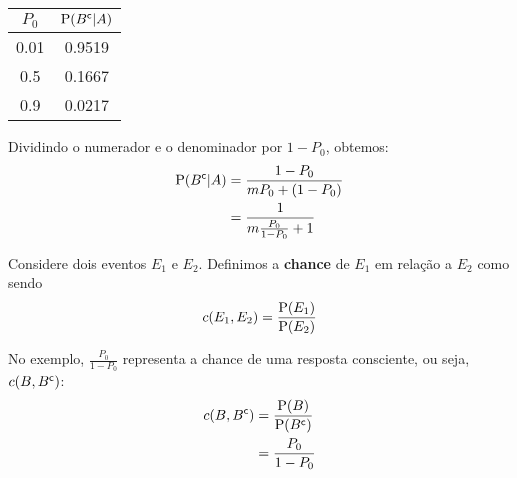 \begin{example}
    \begin{center}
        \begin{tabular}{c|c}
            \toprule
            $P_0$ & $\operatorname{P}({B}^{\mathsf{c}} | A)$ \\
            \midrule
            0.01 & 0.9519 \\
            0.5  & 0.1667 \\
            0.9  & 0.0217 \\
            \bottomrule
        \end{tabular}
    \end{center}

    Dividindo o numerador e o denominador por $1 - P_0$, obtemos:
    \begin{align*}
        \operatorname{P}({B}^{\mathsf{c}} | A) 
        &= \frac{1 - P_0}
            {mP_0 + (1 - P_0)} \\
        &= \frac{1}
            {m\frac{P_0}{1 - P_0} + 1}
    \end{align*}

    \begin{definition}
        Considere dois eventos $E_1$ e $E_2$. Definimos a \textbf{chance}
        de $E_1$ em relação a $E_2$ como sendo
        \begin{align}
            c(E_1, E_2) = \frac{\operatorname{P}(E_1)}{\operatorname{P}(E_2)}
                \label{eq:ch01-odds-ratio}
        \end{align}
    \end{definition}

    No exemplo, $\frac{P_0}{1 - P_0}$ representa a chance de uma
    resposta consciente, ou seja, $c(B, {B}^{\mathsf{c}})$:
    \begin{align*}
        c(B, {B}^{\mathsf{c}}) &= \frac{\operatorname{P}(B)}{\operatorname{P}({B}^{\mathsf{c}})} \\
        &= \frac{P_0}{1 - P_0}
    \end{align*}
\end{example}
